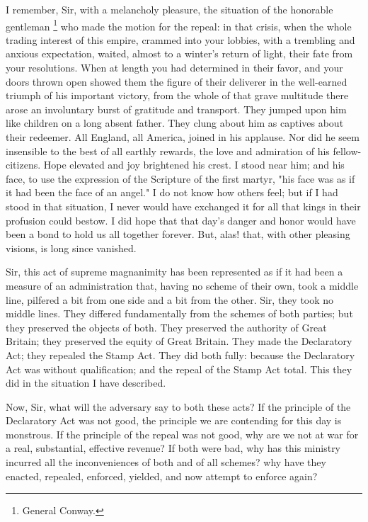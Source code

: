 I remember, Sir, with a melancholy pleasure, the situation of the honorable gentleman
\footnote{General Conway.}
who made the motion for the repeal: in that crisis, when the whole trading interest of this empire, crammed into your lobbies, with a trembling and anxious expectation, waited, almost to a winter's return of light, their fate from your resolutions. When at length you had determined in their favor, and your doors thrown open showed them the figure of their deliverer in the well-earned triumph of his important victory, from the whole of that grave multitude there arose an involuntary burst of gratitude and transport. They jumped upon him like children on a long absent father. They clung about him as captives about their redeemer. All England, all America, joined in his applause. Nor did he seem insensible to the best of all earthly rewards, the love and admiration of his fellow-citizens. Hope elevated and joy brightened his crest. I stood near him; and his face, to use the expression of the Scripture of the first martyr, "his face was as if it had been the face of an angel." I do not know how others feel; but if I had stood in that situation, I never would have exchanged it for all that kings in their profusion could bestow. I did hope that that day's danger and honor would have been a bond to hold us all together forever. But, alas! that, with other pleasing visions, is long since vanished.

Sir, this act of supreme magnanimity has been represented as if it had been a measure of an administration that, having no scheme of their own, took a middle line, pilfered a bit from one side and a bit from the other. Sir, they took no middle lines. They differed fundamentally from the schemes of both parties; but they preserved the objects of both. They preserved the authority of Great Britain; they preserved the equity of Great Britain. They made the Declaratory Act; they repealed the Stamp Act. They did both fully: because the Declaratory Act was without qualification; and the repeal of the Stamp Act total. This they did in the situation I have described.

Now, Sir, what will the adversary say to both these acts? If the principle of the Declaratory Act was not good, the principle we are contending for this day is monstrous. If the principle of the repeal was not good, why are we not at war for a real, substantial, effective revenue? If both were bad, why has this ministry incurred all the inconveniences of both and of all schemes? why have they enacted, repealed, enforced, yielded, and now attempt to enforce again?

